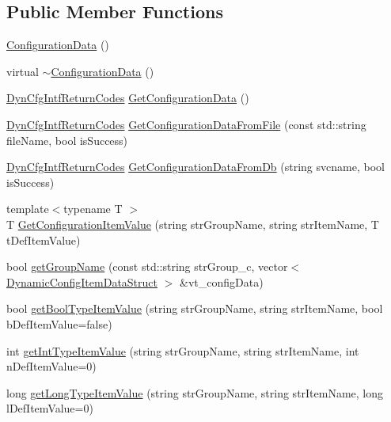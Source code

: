 \subsection*{Public Member Functions}
\begin{DoxyCompactItemize}
\item 
\hyperlink{classConfigurationData_a8cb8af69711def4253a59956e7b33c15}{Configuration\+Data} ()
\item 
virtual \hyperlink{classConfigurationData_a4f90f14791e6c4dc6836dffab3ae49ae}{$\sim$\+Configuration\+Data} ()
\item 
\hyperlink{ConfigurationData_8h_a4e9a8de26cf7d053d8e1db76220bdc33}{Dyn\+Cfg\+Intf\+Return\+Codes} \hyperlink{classConfigurationData_a85ef47317952a9369b474c8df2525322}{Get\+Configuration\+Data} ()
\item 
\hyperlink{ConfigurationData_8h_a4e9a8de26cf7d053d8e1db76220bdc33}{Dyn\+Cfg\+Intf\+Return\+Codes} \hyperlink{classConfigurationData_ae3be498bfc92a2162247810dfb37f6ec}{Get\+Configuration\+Data\+From\+File} (const std\+::string file\+Name, bool is\+Success)
\item 
\hyperlink{ConfigurationData_8h_a4e9a8de26cf7d053d8e1db76220bdc33}{Dyn\+Cfg\+Intf\+Return\+Codes} \hyperlink{classConfigurationData_aa5fd34a8fabbe045ec9b607a94fc021c}{Get\+Configuration\+Data\+From\+Db} (string svcname, bool is\+Success)
\item 
{\footnotesize template$<$typename T $>$ }\\T \hyperlink{classConfigurationData_a5960620b5e6e32d288157bb35860aa4d}{Get\+Configuration\+Item\+Value} (string str\+Group\+Name, string str\+Item\+Name, T t\+Def\+Item\+Value)
\item 
bool \hyperlink{classConfigurationData_a37a40d143e56aa3577cace34049091df}{get\+Group\+Name} (const std\+::string str\+Group\+\_\+c, vector$<$ \hyperlink{structDynamicConfigItemDataStruct}{Dynamic\+Config\+Item\+Data\+Struct} $>$ \&vt\+\_\+config\+Data)
\item 
bool \hyperlink{classConfigurationData_a4d298695a36f8537adff911698e8da6a}{get\+Bool\+Type\+Item\+Value} (string str\+Group\+Name, string str\+Item\+Name, bool b\+Def\+Item\+Value=false)
\item 
int \hyperlink{classConfigurationData_a54bb3e76dfb9e720bbcb41a277e1aee1}{get\+Int\+Type\+Item\+Value} (string str\+Group\+Name, string str\+Item\+Name, int n\+Def\+Item\+Value=0)
\item 
long \hyperlink{classConfigurationData_ace8acd6f1471ffc98cc2df5e526d7e3a}{get\+Long\+Type\+Item\+Value} (string str\+Group\+Name, string str\+Item\+Name, long l\+Def\+Item\+Value=0)

\end{DoxyCompactItemize}
